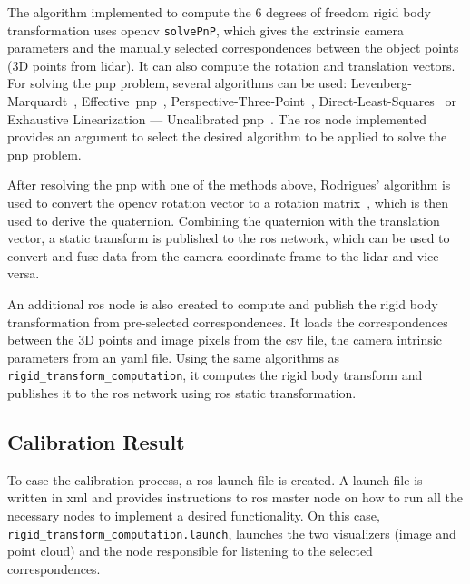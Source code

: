 %	


The algorithm implemented to compute the 6 degrees of freedom rigid body transformation uses \ac{opencv} \texttt{solvePnP}, which gives the extrinsic camera parameters and the manually selected correspondences between the object points (3D points from \ac{lidar}). It can also compute the rotation and translation vectors. For solving the \ac{pnp} problem, several algorithms can be used: Levenberg-Marquardt~\cite{Levenberg1943}, Effective~\ac{pnp}~\cite{Lepetit2009}, Perspective-Three-Point~\cite{Gao2003}, Direct-Least-Squares~\cite{Hesch2011} or Exhaustive Linearization — Uncalibrated \ac{pnp}~\cite{Penate-Sanchez2013a}. The \ac{ros} node implemented provides an argument to select the desired algorithm to be applied to solve the \ac{pnp} problem.

After resolving the \ac{pnp} with one of the methods above, Rodrigues' algorithm is used to convert the \ac{opencv} rotation vector to a rotation matrix~\cite{Dai2015}, which is then used to derive the quaternion. Combining the quaternion with the translation vector, a static transform is published to the \ac{ros} network, which can be used to convert and fuse data from the camera coordinate frame to the \ac{lidar} and vice-versa.

An additional \ac{ros} node is also created to compute and publish the rigid body transformation from pre-selected correspondences. It loads the correspondences between the 3D points and image pixels from the \ac{csv} file, the camera intrinsic parameters from an \acs{yaml} file. Using the same algorithms as \texttt{rigid\_transform\_computation}, it computes the rigid body transform and publishes it to the \ac{ros} network using \ac{ros} static transformation.


\subsection{Calibration Result}
\label{subsec:calibration:extrinsic-results}
To ease the calibration process, a \ac{ros} launch file is created. A launch file is written in \ac{xml} and provides instructions to \ac{ros} master node on how to run all the necessary nodes to implement a desired functionality. On this case, \texttt{rigid\_transform\_computation.launch}, launches the two visualizers (image and point cloud) and the node responsible for listening to the selected correspondences. 

